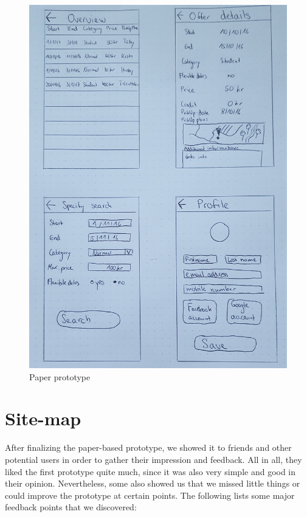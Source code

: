 \documentclass[11pt,twoside,a4paper]{report}
\begin{document}
\begin{figure}
	\centering
	\includegraphics[width=\textwidth]{Paper_prototype2.jpg}
	\caption{Paper prototype}
\end{figure}


\newpage
\section{Site-map}

After finalizing the paper-based prototype, we showed it to friends and other potential users in order to gather their impression and feedback. All in all, they liked the first prototype quite much, since it was also very simple and good in their opinion. Nevertheless, some also showed us that we missed little things or could improve the prototype at certain points. The following lists some major feedback points that we discovered:
\end{document}
